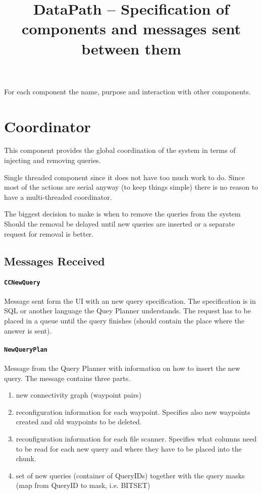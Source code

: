 \documentclass[11pt]{article}
\begin{document}
\title{DataPath -- Specification of components and messages sent
  between them}
\maketitle


For each component the name, purpose and interaction with other
components.


\section{Coordinator}

This component provides the global coordination of the system in terms
of injecting and removing queries.

Single threaded component since it does not have too much work to
do. Since most of the actions are serial anyway (to keep things
simple) there is no reason to have a multi-threaded coordinator.

The biggest decision to make is when to remove the queries from the
system Should the removal be delayed until new queries are inserted or
a separate request for removal is better.



\subsection{Messages Received}

\paragraph*{\texttt{CCNewQuery}} Message sent form the UI with an new
query specification. The specification is in SQL or another language
the Quey Planner understands. The request has to be placed in a queue
until the query finishes (should contain the place where the answer is
sent).

\paragraph*{\texttt{NewQueryPlan}} Message from the Query Planner with
information on how to insert the new query. The message contains three
parts.
\begin{enumerate}
\item new connectivity graph (waypoint pairs)
\item reconfiguration information for each waypoint. Specifies also
  new waypoints created and old waypoints to be deleted.
\item reconfiguration information for each file scanner. Specifies
  what columns need to be read for each new query and where they have
  to be placed into the chunk.
\item set of new queries (container of QueryIDs) together with the
  query masks (map from QueryID to mask, i.e. BITSET)
\end{enumerate}
\end{document}
